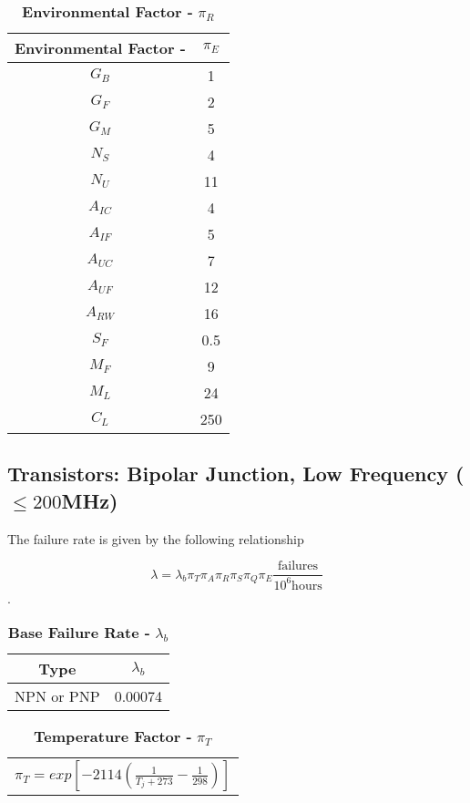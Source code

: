 \begin{table}[h]
\caption{\textbf{Environmental Factor -} $\pi_{R}$}
\label{table:environmentalFactorFast}
\begin{tabular}{|c|c|} \hline
\rowcolor{Gray}
\textbf{Environmental Factor -} & $\pi_{E}$ \\ \hline
$G_{B}$ & 1 \\ \hline
$G_{F}$ & 2 \\ \hline
$G_{M}$ & 5 \\ \hline
$N_{S}$ & 4 \\ \hline
$N_{U}$ & 11 \\ \hline
$A_{IC}$ & 4 \\ \hline
$A_{IF}$ & 5 \\ \hline
$A_{UC}$ & 7 \\ \hline
$A_{UF}$ & 12 \\ \hline
$A_{RW}$ & 16 \\ \hline
$S_{F}$ & 0.5 \\ \hline
$M_{F}$ & 9 \\ \hline
$M_{L}$ & 24 \\ \hline
$C_{L}$ & 250 \\ \hline
\end{tabular}
\end{table}


\newpage

\subsection{Transistors: Bipolar Junction, Low Frequency ($\leq 200$MHz)}
\label{subsection:transistors-bipolar-junction-low-frequency-200mhz}

The failure rate is given by the following relationship

$$\lambda = \lambda_{b} \pi_T \pi_A \pi_R \pi_S \pi_Q \pi_E \frac{\text{failures}}{10^6 \text{hours}}$$.

\begin{table}[h]
\caption{\textbf{Base Failure Rate -} $\lambda_{b}$}
\label{table:baseFailureRateTransSlow}
\begin{tabular}{|c|c|} \hline
\rowcolor{Gray}
\textbf{Type} & $\lambda_{b}$ \\ \hline
NPN or PNP & 0.00074 \\ \hline
\end{tabular}
\end{table}

\begin{table}[h]
\caption{\textbf{Temperature Factor -} $\pi_{T}$}
\label{table:tempFactorTransSlow}
\begin{tabular}{l} 
$\pi_{T} = exp[-2114(\frac{1}{T_{j} + 273} - \frac{1}{298})]$
\end{tabular}
\end{table}

